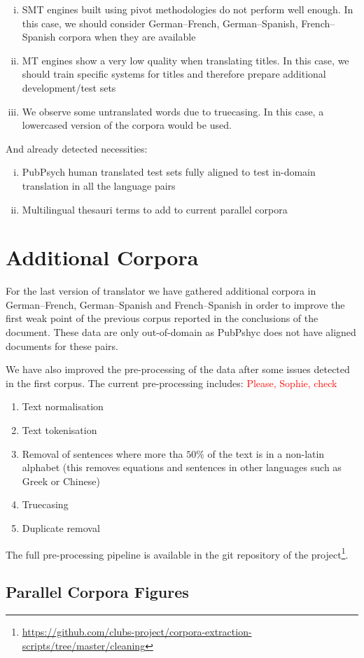 \documentclass[a4paper,11pt]{article}
\newcommand{\red}[1]{\textcolor{red}{#1}}
\begin{document}
\begin{enumerate}[(i)]
\itemsep0em 
 \item SMT engines built using pivot methodologies do not perform well enough. In this case, we should consider German--French, German--Spanish, French--Spanish corpora when they are available
 \item MT engines show a very low quality when translating titles. In this case, we should train specific systems for titles and therefore prepare additional development/test sets
 \item We observe some untranslated words due to truecasing. In this case, a lowercased version of the corpora would be used.
\end{enumerate}

And already detected necessities:
\begin{enumerate}[(i)]
\itemsep0em 
 \item PubPsych human translated test sets fully aligned to test in-domain translation in all the language pairs
 \item Multilingual thesauri terms to add to current parallel corpora
\end{enumerate}


\appendix                                     
\section{Additional Corpora}

For the last version of translator we have gathered additional corpora in  German--French, German--Spanish and French--Spanish in order to improve the first weak point of the previous corpus reported in the conclusions of the document. These data are only out-of-domain as PubPshyc does not have aligned documents for these pairs.

We have also improved the pre-processing of the data after some issues detected in the first corpus. The current pre-processing includes: \red{Please, Sophie, check}

\begin{enumerate}
\itemsep0em 
 \item Text normalisation
 \item Text tokenisation
 \item Removal of sentences where more tha $50\%$ of the text is in a non-latin alphabet (this removes equations and sentences in other languages such as Greek or Chinese)
 \item Truecasing
 \item Duplicate removal
\end{enumerate}

\noindent
The full pre-processing pipeline is available in the git repository of the project\footnote{\url{https://github.com/clubs-project/corpora-extraction-scripts/tree/master/cleaning}}.



\subsection{Parallel Corpora Figures}

%
%
\newpage
{}


\end{document}
